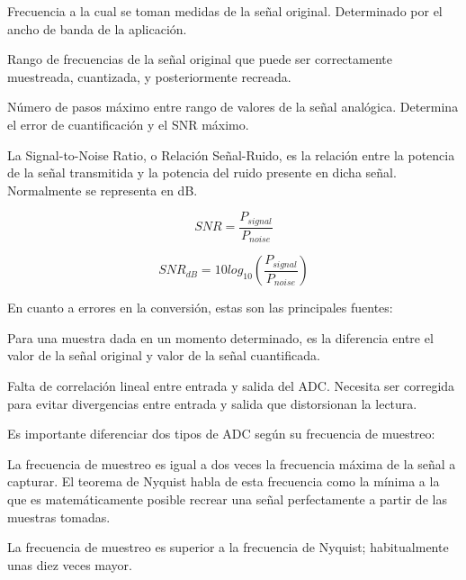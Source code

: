 \documentclass[12pt]{report} %
\begin{document}
	\begin{description}[font=\bfseries, style=multiline, align=left, before={\renewcommand\makelabel[1]{\bfseries ##1:}}]
		\item[Frecuencia de muestreo] Frecuencia a la cual se toman medidas de la señal original. Determinado por el ancho de banda de la aplicación.
		\item[Ancho de banda] Rango de frecuencias de la señal original que puede ser correctamente muestreada, cuantizada, y posteriormente recreada. 
		\item[Resolución] Número de pasos máximo entre rango de valores de la señal analógica. Determina el error de cuantificación y el SNR máximo.
		\item[SNR] La Signal-to-Noise Ratio, o Relación Señal-Ruido, es la relación entre la potencia de la señal transmitida y la potencia del ruido presente en dicha señal. Normalmente se representa en dB. 
			\begin{figure}[H]
				\begin{equation}
					\label{snr}
					SNR = \frac{P_{signal}}{P_{noise}}
				\end{equation}
			\end{figure}
			\begin{figure}[H]
				\begin{equation}
					\label{snr-db}
					SNR_{dB} = 10 log_{10} (\frac{P_{signal}}{P_{noise}})
				\end{equation}
			\end{figure}
					
	\end{description}

	En cuanto a errores en la conversión, estas son las principales fuentes:
	
	\begin{description}[font=\bfseries, style=multiline, align=left, before={\renewcommand\makelabel[1]{\bfseries ##1:}}]
		\item[Cuantificación] Para una muestra dada en un momento determinado, es la diferencia entre el valor de la señal original y valor de la señal cuantificada.
		\item[Linealidad] Falta de correlación lineal entre entrada y salida del ADC. Necesita ser corregida para evitar divergencias entre entrada y salida que distorsionan la lectura.
	\end{description}

	Es importante diferenciar dos tipos de ADC según su frecuencia de muestreo:
	\begin{description}[font=\bfseries, style=multiline, align=left, before={\renewcommand\makelabel[1]{\bfseries ##1:}}]
		\item[A frecuencia de Nyquist] La frecuencia de muestreo es igual a dos veces la frecuencia máxima de la señal a capturar\cite{nyquist}\cite{shannon-nyquist}. El teorema de Nyquist habla de esta frecuencia como la mínima a la que es matemáticamente posible recrear una señal perfectamente a partir de las muestras tomadas.
		\item[Sobremuestreados] La frecuencia de muestreo es superior a la frecuencia de Nyquist; habitualmente unas diez veces mayor.
	\end{description}
	
\end{document}
